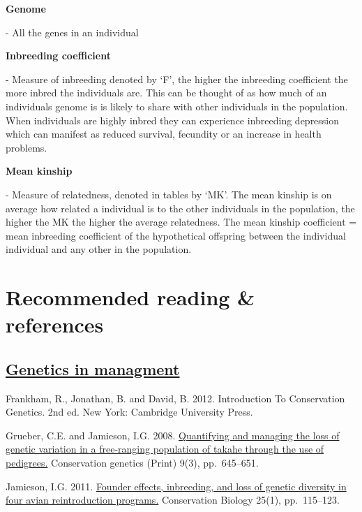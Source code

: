 \documentclass[12pt,]{article}
\begin{document}
\hypertarget{term3}{\textbf{Genome}} - All the genes in an
individual\newline   

\hypertarget{term4}{\textbf{Inbreeding coefficient}} - Measure of
inbreeding denoted by `F', the higher the inbreeding coefficient the
more inbred the individuals are. This can be thought of as how much of
an individuals genome is is likely to share with other individuals in
the population. When individuals are highly inbred they can experience
inbreeding depression which can manifest as reduced survival, fecundity
or an increase in health problems.\newline

\hypertarget{term2}{\textbf{Mean kinship}} - Measure of relatedness,
denoted in tables by `MK'. The mean kinship is on average how related a
individual is to the other individuals in the population, the higher the
MK the higher the average relatedness. The mean kinship coefficient =
mean inbreeding coefficient of the hypothetical offspring between the
individual individual and any other in the population.

\hypertarget{reading}{\section{\textbf{Recommended reading \& references}}}

\subsection{\underline{\textbf{Genetics in managment}}}

Frankham, R., Jonathan, B. and David, B. 2012. Introduction To
Conservation Genetics. 2nd ed. New York: Cambridge University
Press.\newline

Grueber, C.E. and Jamieson, I.G. 2008.
\href{https://www.researchgate.net/publication/225887206_Quantifying_and_managing_the_loss_of_genetic_variation_in_a_free-ranging_population_of_takahe_through_the_use_of_pedigrees}{Quantifying and managing the loss of genetic variation in a free-ranging population of takahe through the use of pedigrees.}
Conservation genetics (Print) 9(3), pp.~645--651.\newline

Jamieson, I.G. 2011.
\href{https://onlinelibrary.wiley.com/doi/full/10.1111/j.1523-1739.2010.01574.x}{Founder effects, inbreeding, and loss of genetic diversity in four avian reintroduction programs.}
Conservation Biology 25(1), pp.~115--123.\newline
\end{document}

